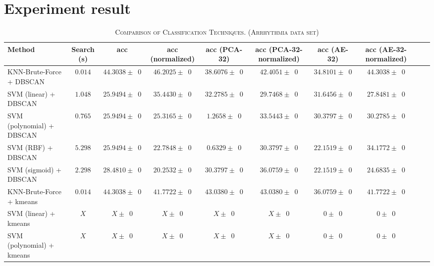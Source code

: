 \documentclass[twocolumn,10pt]{article}
\begin{document}
\section{Experiment result}
  \begin{table*}[htb]
    \newcommand{\z}{\phantom{0}}
    \caption{\textsc{Comparison of Classification Techniques. (Arrhythmia data set)}}
      \vspace{-\baselineskip}
    \begin{tabular}{@{}lccccccccl@{}}\toprule
    Method                    & Search (s) & acc                               & acc (normalized)             & acc (PCA-32)                & acc (PCA-32-normalized)    & acc (AE-32)            & acc (AE-32-normalized) \\ \midrule
    KNN-Brute-Force + DBSCAN  & $0.014$    & $44.3038 \pm \z{0}$               & $46.2025 \pm \z{0}$          & $38.6076 \pm \z{0}$         & $42.4051\pm\z{0}$          & $34.8101 \pm \z{0}$    & $44.3038 \pm \z{0}$\\
    SVM (linear) + DBSCAN     & $1.048$    & $25.9494 \pm \z{0}$               & $35.4430 \pm \z{0}$          & $32.2785 \pm \z{0}$         & $29.7468 \pm \z{0}$        & $31.6456 \pm \z{0}$    & $27.8481 \pm \z{0}$\\
    SVM (polynomial) + DBSCAN & $0.765$    & $25.9494 \pm \z{0}$               & $25.3165 \pm \z{0}$          & $1.2658 \pm \z{0}$          & $33.5443 \pm \z{0}$        & $30.3797 \pm \z{0}$    & $30.2785 \pm \z{0}$\\
    SVM (RBF) + DBSCAN        & $5.298$    & $25.9494 \pm \z{0}$               & $22.7848 \pm \z{0}$          & $0.6329 \pm \z{0}$          & $30.3797 \pm \z{0}$        & $22.1519 \pm \z{0}$    & $34.1772 \pm \z{0}$\\
    SVM (sigmoid) + DBSCAN    & $2.298$    & $28.4810 \pm \z{0}$               & $20.2532 \pm \z{0}$          & $30.3797 \pm \z{0}$         & $36.0759 \pm \z{0}$        & $22.1519 \pm \z{0}$    & $24.6835 \pm \z{0}$\\
    KNN-Brute-Force + kmeans  & $0.014$    & $44.3038 \pm \z{0}$               & $41.7722 \pm \z{0}$          & $43.0380 \pm \z{0}$         & $43.0380 \pm \z{0}$        & $36.0759 \pm \z{0}$    & $41.7722 \pm \z{0}$\\
    SVM (linear) + kmeans     & $X$        & $X \pm \z{0}$                     & $X \pm \z{0}$           & $X \pm \z{0}$                  & $X \pm \z{0}$         & $0 \pm \z{0}$                    & $0 \pm \z{0}$\\
    SVM (polynomial) + kmeans & $X$        & $X \pm \z{0}$                     & $X \pm \z{0}$           & $X \pm \z{0}$                  & $X \pm \z{0}$         & $0 \pm \z{0}$                    & $0 \pm \z{0}$\\

\end{tabular}
\end{table*}
\end{document}
